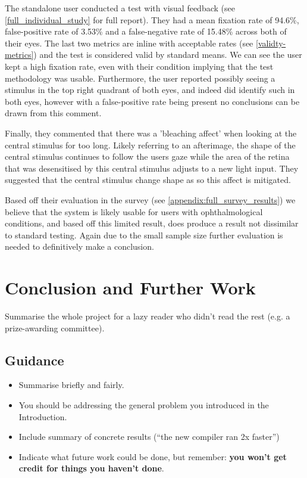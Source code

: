 \documentclass{l4proj}
\begin{document}
The standalone user conducted a test with visual feedback (see \ref{full_individual_study} for full report). They had a mean fixation rate of 94.6\%, false-positive rate of 3.53\% and a false-negative rate of 15.48\% across both of their eyes. The last two metrics are inline with acceptable rates (see \ref{validty-metrics}) and the test is considered valid by standard means. We can see the user kept a high fixation rate, even with their condition implying that the test methodology was usable. Furthermore, the user reported possibly seeing a stimulus in the top right quadrant of both eyes, and indeed did identify such in both eyes, however with a false-positive rate being present no conclusions can be drawn from this comment. 

Finally, they commented that there was a 'bleaching affect' when looking at the central stimulus for too long. Likely referring to an afterimage, the shape of the central stimulus continues to follow the users gaze while the area of the retina that was desensitised by this central stimulus adjusts to a new light input. They suggested that the central stimulus change shape as so this affect is mitigated. 

Based off their evaluation in the survey (see \ref{appendix:full_survey_results}) we believe that the system is likely usable for users with ophthalmological conditions, and based off this limited result, does produce a result not dissimilar to standard testing. Again due to the small sample size further evaluation is needed to definitively make a conclusion. 

\chapter{Conclusion and Further Work}    
Summarise the whole project for a lazy reader who didn't read the rest (e.g. a prize-awarding committee).
\section{Guidance}
\begin{itemize}
    \item
        Summarise briefly and fairly.
    \item
        You should be addressing the general problem you introduced in the
        Introduction.        
    \item
        Include summary of concrete results (``the new compiler ran 2x
        faster'')
    \item
        Indicate what future work could be done, but remember: \textbf{you
        won't get credit for things you haven't done}.
\end{itemize}
\end{document}
